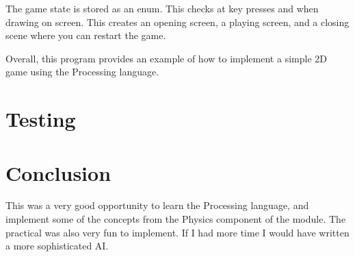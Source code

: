 \documentclass[11pt]{article}
\begin{document}
The game state is stored as an enum. This checks at key presses and when drawing on screen. This creates an opening screen, a playing screen, and a closing scene where you can restart the game.

Overall, this program provides an example of how to implement a simple 2D game using the Processing language.

\section{Testing}
\label{sec:orgb687217}
\section{Conclusion}
\label{sec:org432c45d}
This was a very good opportunity to learn the Processing language, and implement some of the concepts from the Physics component of the module. The practical was also very fun to implement. If I had more time I would have written a more sophisticated AI.
\end{document}
